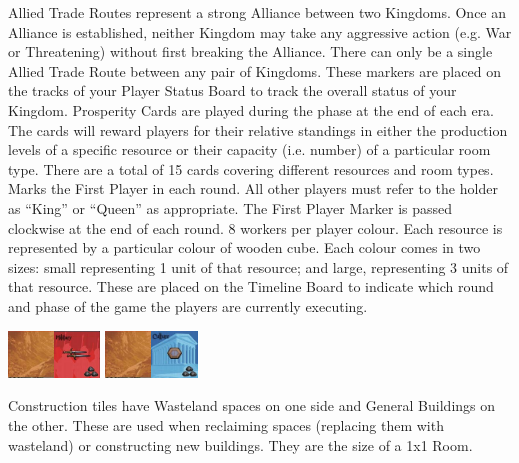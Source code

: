 \documentclass[10pt,twocolumn]{article}
\begin{document}
Allied Trade Routes represent a strong Alliance between two Kingdoms. Once an Alliance is established, neither Kingdom may take any aggressive action (e.g. War or Threatening) without first breaking the Alliance. There can only be a single Allied Trade Route between any pair of Kingdoms.
These markers are placed on the tracks of your Player Status Board to track the overall status of your Kingdom.
Prosperity Cards are played during the  phase at the end of each era. The cards will reward players for their relative standings in either the production levels of a specific resource or their capacity (i.e. number) of a particular room type. There are a total of 15 cards covering different resources and room types.
Marks the First Player in each round. All other players must refer to the holder as ``King'' or ``Queen'' as appropriate. The First Player Marker is passed clockwise at the end of each round.
8 workers per player colour.
Each resource is represented by a particular colour of wooden cube. Each colour comes in two sizes: small representing 1 unit of that resource; and large, representing 3 units of that resource.
These are placed on the Timeline Board to indicate which round and phase of the game the players are currently executing.
\centerline{\includegraphics[height=1.25cm]{CT1}\includegraphics[height=1.25cm]{CT2}  \includegraphics[height=1.25cm]{CT3}\includegraphics[height=1.25cm]{CT4}}
Construction tiles have Wasteland spaces on one side and General Buildings on the other. These are used when reclaiming spaces (replacing them with wasteland) or constructing new buildings. They are the size of a 1x1 Room.
\end{document}
